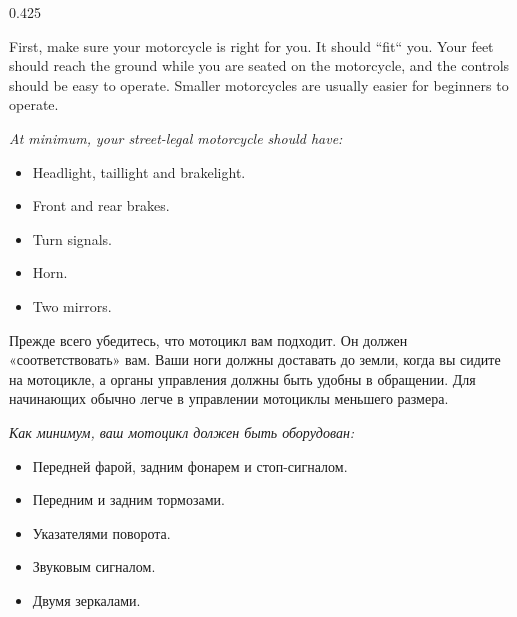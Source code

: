 \begin{langblock}{0.425}
\begin{eng}	
	First, make sure your motorcycle is right for you. It should ``fit`` you. Your feet should reach the ground while you are seated on the motorcycle, and the controls should be easy to operate. Smaller motorcycles are usually easier for beginners to operate.
	
	\textit{At minimum, your street-legal motorcycle should have:}
	\begin{itemize}[noitemsep]
		\bfseries
		\item Headlight, taillight and brakelight.
		\item Front and rear brakes.
		\item Turn signals.
		\item Horn.
		\item Two mirrors.
	\end{itemize}
\end{eng}
\begin{rus}
		Прежде всего убедитесь, что мотоцикл вам подходит. Он должен «соответствовать» вам. Ваши ноги должны доставать до земли, когда вы сидите на мотоцикле, а органы управления должны быть удобны в обращении. Для начинающих обычно легче в управлении мотоциклы меньшего размера.
		
		\textit{Как минимум, ваш мотоцикл должен быть оборудован:}
		\begin{itemize}[noitemsep]
			\bfseries
			\item Передней фарой, задним фонарем и стоп-сигналом.
			\item Передним и задним тормозами.
			\item Указателями поворота.
			\item Звуковым сигналом.
			\item Двумя зеркалами.
		\end{itemize}
\end{rus}
\end{langblock}










